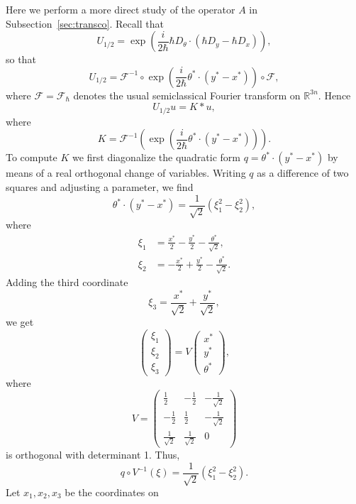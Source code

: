 \documentclass{article}
\newcommand{\RM}{\mathbb{R}}
\newcommand{\h}{\hbar}
\begin{document}
Here we perform a more direct study of the operator $A$ in
Subsection~\ref{sec:transco}. Recall that
\[
U_{1/2}=\exp \left(\frac{i}{2\h}\h D_\theta \cdot (\h D_y-\h D_x)
\right) ,
\]
so that
\[
U_{1/2}=\mathcal{F}^{-1}\circ \exp \left(\frac{i}{2\h}\theta^* \cdot
  (y^*-x^*) \right)\circ \mathcal{ F} ,
\]
where $\mathcal{F} = \mathcal{F}_\h$ denotes the usual semiclassical
Fourier transform on $\RM^{3n}$. Hence
\[
U_{1/2}u=K*u,
\]
where
\begin{equation}\label{dsa.1}
  K=\mathcal{ F}^{-1}\left( \exp \left(\frac{i}{2\h}\theta^* \cdot 
      (y^*-x^*) \right) \right) .
\end{equation}
To compute $K$ we first diagonalize the quadratic form
$q=\theta ^*\cdot (y^*-x^*)$ by means of a real orthogonal change of
variables.  Writing $q$ as a difference of two squares and adjusting a
parameter, we find
\begin{equation}\label{dsa.2}
  \theta ^*\cdot (y^*-x^*)=\frac{1}{\sqrt{2}}(\xi _1^2-\xi _2^2),
\end{equation}
where
\[
\begin{split}
  \xi _1&=\frac{x^*}{2}-\frac{y^*}{2}-\frac{\theta ^*}{\sqrt{2}},\\
  \xi _2&=-\frac{x^*}{2}+\frac{y^*}{2}-\frac{\theta ^*}{\sqrt{2}}.
\end{split}
\]
Adding the third coordinate
\[
\xi _3=\frac{x^*}{\sqrt{2}}+\frac{y^*}{\sqrt{2}},
\]
we get
\[
\begin{pmatrix}\xi _1\\\xi _2\\\xi _3\end{pmatrix}=V\begin{pmatrix}
  x^*\\ y^*\\ \theta ^*\end{pmatrix},
\]
where
\begin{equation}\label{dsa.3}
  V=\begin{pmatrix}\frac{1}{2} & -\frac{1}{2} & -\frac{1}{\sqrt{2}}\\
    -\frac{1}{2} & \frac{1}{2} & -\frac{1}{\sqrt{2}}\\
    \frac{1}{\sqrt{2}} & \frac{1}{\sqrt{2}} & 0
  \end{pmatrix}
\end{equation}
is orthogonal with determinant 1. Thus,
\begin{equation}\label{dsa.4}
  q\circ V^{-1}(\xi )=\frac{1}{\sqrt{2}}(\xi _1^2-\xi _2^2).
\end{equation}
Let $x_1,x_2,x_3$ be the coordinates on
\end{document}
